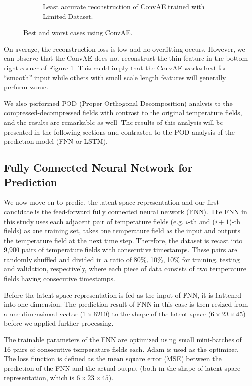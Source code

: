\begin{figure}[H]
\begin{subfigure}{0.45\textwidth}
    \caption{Least accurate reconstruction of ConvAE trained with Limited Dataset.}
    \label{figure:ConvAE_limited_worst}
\end{subfigure}     
\caption{Best and worst cases using ConvAE.}
\label{figure:ConvAE_limited_best_worst}
\end{figure}


On average, the reconstruction loss is low and no overfitting occurs. However, we can observe that the ConvAE does not reconstruct the thin feature in the bottom right corner of Figure \ref{figure:ConvAE_limited_worst}. This could imply that the ConvAE works best for ``smooth'' input while others with small scale length features will generally perform worse.

We also performed POD (Proper Orthogonal Decomposition) analysis to the compressed-decompressed fields with contrast to the original temperature fields, and the results are remarkable as well. The results of this analysis will be presented in the following sections and contrasted to the POD analysis of the prediction model (FNN or LSTM).


\subsection{Fully Connected Neural Network for Prediction}

We now move on to predict the latent space representation and our first candidate is the feed-forward fully connected neural network (FNN). The FNN in this study uses each adjacent pair of temperature fields (e.g. $i$-th and ($i+1$)-th fields) as one training set, takes one temperature field as the input and outputs the temperature field at the next time step. Therefore, the dataset is recast into 9,900 pairs of temperature fields with consecutive timestamps. These pairs are randomly shuffled and divided in a ratio of 80\%, 10\%, 10\% for training, testing and validation, respectively, where each piece of data consists of two temperature fields having consecutive timestamps.

Before the latent space representation is fed as the input of FNN, it is flattened into one dimension. The prediction result of FNN in this case is then resized from a one dimensional vector ($1 \times 6210$) to the shape of the latent space ($6 \times 23 \times 45$) before we applied further processing.

The trainable parameters of the FNN are optimized using small mini-batches of 16 pairs of consecutive temperature fields each. Adam is used as the optimizer. The loss function is defined as the mean square error (MSE) between the prediction of the FNN and the actual output (both in the shape of latent space representation, which is $6 \times 23 \times 45$).

